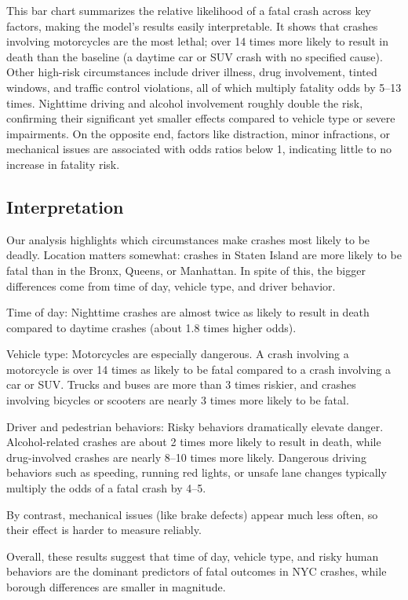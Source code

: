 \documentclass[10pt]{article}\usepackage[]{graphicx}\usepackage[]{xcolor}
\begin{document}
This bar chart summarizes the relative likelihood of a fatal crash across key factors, making the model’s results easily interpretable. It shows that crashes involving motorcycles are the most lethal; over 14 times more likely to result in death than the baseline (a daytime car or SUV crash with no specified cause). Other high-risk circumstances include driver illness, drug involvement, tinted windows, and traffic control violations, all of which multiply fatality odds by 5–13 times. Nighttime driving and alcohol involvement roughly double the risk, confirming their significant yet smaller effects compared to vehicle type or severe impairments. On the opposite end, factors like distraction, minor infractions, or mechanical issues are associated with odds ratios below 1, indicating little to no increase in fatality risk.

\subsection{Interpretation}
Our analysis highlights which circumstances make crashes most likely to be deadly. Location matters somewhat: crashes in Staten Island are more likely to be fatal than in the Bronx, Queens, or Manhattan. In spite of this, the bigger differences come from time of day, vehicle type, and driver behavior.

Time of day: Nighttime crashes are almost twice as likely to result in death compared to daytime crashes (about 1.8 times higher odds).

Vehicle type: Motorcycles are especially dangerous. A crash involving a motorcycle is over 14 times as likely to be fatal compared to a crash involving a car or SUV. Trucks and buses are more than 3 times riskier, and crashes involving bicycles or scooters are nearly 3 times more likely to be fatal.

Driver and pedestrian behaviors: Risky behaviors dramatically elevate danger. Alcohol-related crashes are about 2 times more likely to result in death, while drug-involved crashes are nearly 8–10 times more likely. Dangerous driving behaviors such as speeding, running red lights, or unsafe lane changes typically multiply the odds of a fatal crash by 4–5.

By contrast, mechanical issues (like brake defects) appear much less often, so their effect is harder to measure reliably.

Overall, these results suggest that time of day, vehicle type, and risky human behaviors are the dominant predictors of fatal outcomes in NYC crashes, while borough differences are smaller in magnitude.
\end{document}
